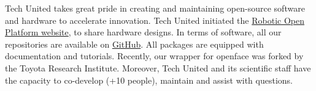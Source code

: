 Tech United takes great pride in creating and maintaining open-source software and hardware to accelerate innovation. Tech United initiated the \href{http://roboticopenplatform.org/}{Robotic Open Platform website}, to share hardware designs. In terms of software, all our repositories are available on \href{https://github.com/tue-robotics}{GitHub}. All packages are equipped with documentation and tutorials. Recently, our wrapper for openface was forked by the Toyota Research Institute. Moreover, Tech United and its scientific staff have the capacity to co-develop (+10 people), maintain and assist with questions. 